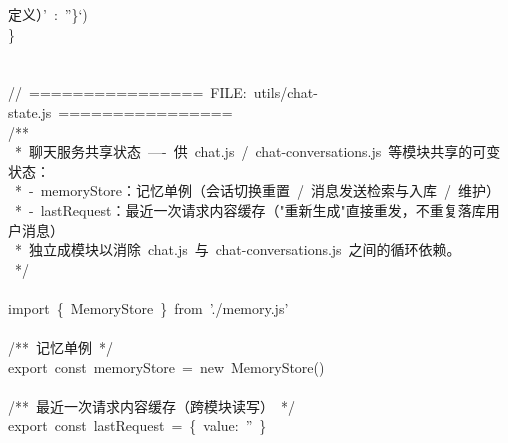 \documentclass[a4paper,10pt]{article}
\begin{document}
{定义）'~:~''\}`)\\
\}\\
\mbox{}\\
\mbox{}\\
//~================~FILE:~utils/chat-state.js~================\\
/**\\
~*~聊天服务共享状态~----~供~chat.js~/~chat-conversations.js~等模块共享的可变状态：\\
~*~-~memoryStore：记忆单例（会话切换重置~/~消息发送检索与入库~/~维护）\\
~*~-~lastRequest：最近一次请求内容缓存（"重新生成"直接重发，不重复落库用户消息）\\
~*~独立成模块以消除~chat.js~与~chat-conversations.js~之间的循环依赖。\\
~*/\\
\mbox{}\\
import~\{~MemoryStore~\}~from~'./memory.js'\\
\mbox{}\\
/**~记忆单例~*/\\
export~const~memoryStore~=~new~MemoryStore()\\
\mbox{}\\
/**~最近一次请求内容缓存（跨模块读写）~*/\\
export~const~lastRequest~=~\{~value:~''~\}
}

\newpage
\end{document}
